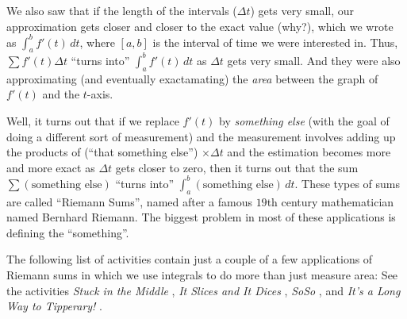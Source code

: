\documentclass{ximera}
\begin{document}
We also saw that if the length of the intervals ($\Delta t$) gets very small, our approximation gets closer and closer to the exact value (why?), which we wrote as  $\int_a^b f'(t) \, dt$, where $[a, b]$ is the interval of time we were interested in.  Thus, $\sum f'(t) \Delta t$  ``turns into'' $\int_a^b f'(t)\, dt$  as $\Delta t$ gets very small.  And they were also approximating (and eventually exactamating) the {\em area} between the graph of $f'(t)$ and the $t$-axis.  

Well, it turns out that if we replace $f'(t)$ by {\em something else} (with the goal of doing a different sort of measurement) and the measurement involves adding up the products of (``that something else'') $\times \Delta t$  and the estimation becomes more and more exact as $\Delta t$ gets closer to zero, then it turns out that the sum  $\sum (\text{something else})$ ``turns into''  $\int_a^b (\text{something else})\, dt$.  These types of sums are called ``Riemann Sums'', named after a famous $19$th century mathematician named Bernhard Riemann.  The biggest problem in most of these applications is defining the ``something''.

The following list of activities contain just a couple of a few applications of Riemann sums in which we use integrals to do more than just measure area: See the activities {\em Stuck in the Middle} , {\em It Slices and It Dices} , {\em SoSo} , and {\em It's a Long Way to Tipperary!} .
\end{document}
